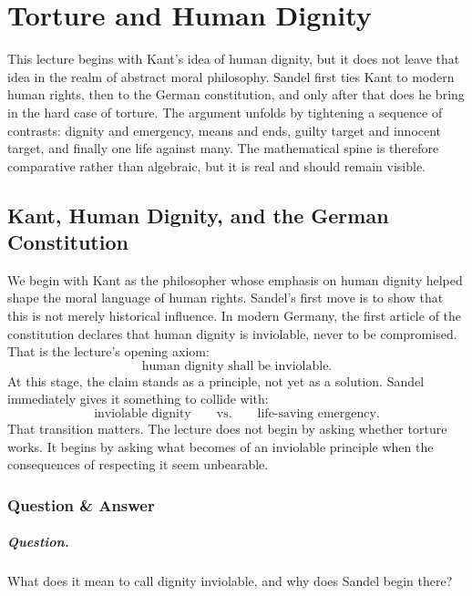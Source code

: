 \chapter{Torture and Human Dignity}

This lecture begins with Kant's idea of human dignity, but it does not leave that idea in the realm of abstract moral philosophy. Sandel first ties Kant to modern human rights, then to the German constitution, and only after that does he bring in the hard case of torture. The argument unfolds by tightening a sequence of contrasts: dignity and emergency, means and ends, guilty target and innocent target, and finally one life against many. The mathematical spine is therefore comparative rather than algebraic, but it is real and should remain visible.

\section{Kant, Human Dignity, and the German Constitution}

We begin with Kant as the philosopher whose emphasis on human dignity helped shape the moral language of human rights. Sandel's first move is to show that this is not merely historical influence. In modern Germany, the first article of the constitution declares that human dignity is inviolable, never to be compromised. That is the lecture's opening axiom:
\begin{equation}
\text{human dignity shall be inviolable}.
\end{equation}
At this stage, the claim stands as a principle, not yet as a solution. Sandel immediately gives it something to collide with:
\begin{equation}
\text{inviolable dignity}
\qquad \text{vs.} \qquad
\text{life-saving emergency}.
\end{equation}
That transition matters. The lecture does not begin by asking whether torture works. It begins by asking what becomes of an inviolable principle when the consequences of respecting it seem unbearable.

\subsection{Question \& Answer}

\paragraph{Question.} What does it mean to call dignity inviolable, and why does Sandel begin there?


